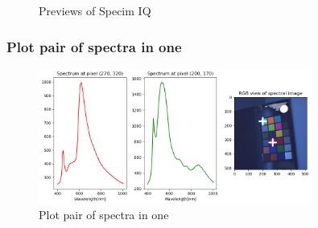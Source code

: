 \begin{figure}[H] %
  \centering
  \hspace{0.1cm}
  \caption[]{Previews of Specim IQ}
  \label{fig:specim-preview}
\end{figure}

\subsubsection{Plot pair of spectra in one}

\begin{figure}[H]
  \centering
  \caption{Plot pair of spectra in one}
  \label{fig:specim-plot}
  \includegraphics[width=0.8\textwidth]{fig-task1/specimIQ-plot.png}
\end{figure}

